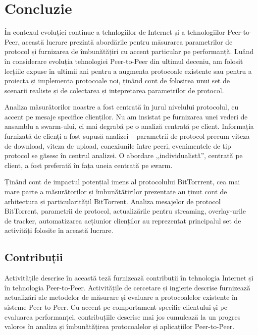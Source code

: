 
\chapter{Concluzie}
\label{chapter:conclusion}

În contexul evoluției continue a tehnlogiilor de Internet și a tehnologiilor
Peer-to-Peer, această lucrare prezintă abordările pentru măsurarea
parametrilor de protocol și furnizarea de îmbunătățiri cu accent particular pe
performanță. Luând în considerare evoluția tehnologiei Peer-to-Peer din
ultimul deceniu, am folosit lecțiile expuse în ultimii ani pentru a augmenta
protocoale existente sau pentru a proiecta și implementa protocoale noi, ținând
cont de folosirea unui set de scenarii realiste și de colectarea și
intepretarea parametrilor de protocol.

Analiza măsurătorilor noastre a fost centrată în jurul nivelului protocolul, cu
accent pe mesaje specifice clienților. Nu am insistat pe furnizarea unei
vederi de ansamblu a swarm-ului, ci mai degrabă pe o analiză centrată pe
client. Informația furnizată de clienți a fost supusă analizei -- parametrii de
protocol precum viteza de download, viteza de upload, conexiunile între peeri,
evenimentele de tip protocol se găsesc în centrul analizei. O abordare
,,individualistă'', centrată pe client, a fost preferată în fața uneia centrată
pe swarm.

Ținând cont de impactul potențial imens al protocolului BitTorrrent, cea mai
mare parte a măsurătorilor și îmbunătățirilor prezentate au ținut cont de
arhitectura și particularitățil BitTorrent. Analiza mesajelor de protocol
BitTorrent, parametrii de protocol, actualizările pentru streaming,
overlay-urile de tracker, automatizarea acțiunior clienților au reprezentat
principalul set de activități folosite în această lucrare.

\section{Contribuții}
\label{sec:conclusion:contributions}

Activitățile descrise în această teză furnizează contribuții în
tehnologia Internet și în tehnologia Peer-to-Peer. Activitățile de cercetare
și ingierie descrise furnizează actualizări ale metodelor de măsurare și
evaluare a protocoalelor existente în sisteme Peer-to-Peer. Cu accent pe
comportament specific clientului și pe evaluarea performanței, contribuțiile
descrise mai jos cumulează la un progres valoros în analiza și îmbunătățirea
protocoalelor și aplicațiilor Peer-to-Peer.

